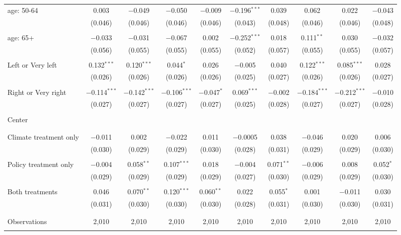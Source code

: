 \begin{tabular}{@{\extracolsep{5pt}}lccccccccc}
 age: 50-64 & 0.003 & $-$0.049 & $-$0.050 & $-$0.009 & $-$0.196$^{***}$ & 0.039 & 0.062 & 0.022 & $-$0.043 \\ 
  & (0.046) & (0.046) & (0.046) & (0.046) & (0.043) & (0.048) & (0.046) & (0.046) & (0.048) \\ 
  & & & & & & & & & \\ 
 age: 65+ & $-$0.033 & $-$0.031 & $-$0.067 & 0.002 & $-$0.252$^{***}$ & 0.018 & 0.111$^{**}$ & 0.030 & $-$0.032 \\ 
  & (0.056) & (0.055) & (0.055) & (0.055) & (0.052) & (0.057) & (0.055) & (0.055) & (0.057) \\ 
  & & & & & & & & & \\ 
 Left or Very left & 0.132$^{***}$ & 0.120$^{***}$ & 0.044$^{*}$ & 0.026 & $-$0.005 & 0.040 & 0.122$^{***}$ & 0.085$^{***}$ & 0.028 \\ 
  & (0.026) & (0.026) & (0.026) & (0.026) & (0.025) & (0.027) & (0.026) & (0.026) & (0.027) \\ 
  & & & & & & & & & \\ 
 Right or Very right & $-$0.114$^{***}$ & $-$0.142$^{***}$ & $-$0.106$^{***}$ & $-$0.047$^{*}$ & 0.069$^{***}$ & $-$0.002 & $-$0.184$^{***}$ & $-$0.212$^{***}$ & $-$0.010 \\ 
  & (0.027) & (0.027) & (0.027) & (0.027) & (0.025) & (0.028) & (0.027) & (0.027) & (0.028) \\ 
  & & & & & & & & & \\ 
 Center &  &  &  &  &  &  &  &  &  \\ 
  &  &  &  &  &  &  &  &  &  \\ 
  & & & & & & & & & \\ 
 Climate treatment only & $-$0.011 & 0.002 & $-$0.022 & 0.011 & $-$0.0005 & 0.038 & $-$0.046 & 0.020 & 0.006 \\ 
  & (0.030) & (0.029) & (0.029) & (0.030) & (0.028) & (0.031) & (0.029) & (0.029) & (0.030) \\ 
  & & & & & & & & & \\ 
 Policy treatment only & $-$0.004 & 0.058$^{**}$ & 0.107$^{***}$ & 0.018 & $-$0.004 & 0.071$^{**}$ & $-$0.006 & 0.008 & 0.052$^{*}$ \\ 
  & (0.029) & (0.029) & (0.029) & (0.029) & (0.027) & (0.030) & (0.029) & (0.029) & (0.030) \\ 
  & & & & & & & & & \\ 
 Both treatments & 0.046 & 0.070$^{**}$ & 0.120$^{***}$ & 0.060$^{**}$ & 0.022 & 0.055$^{*}$ & 0.001 & $-$0.011 & 0.030 \\ 
  & (0.031) & (0.030) & (0.030) & (0.030) & (0.028) & (0.031) & (0.030) & (0.030) & (0.031) \\ 
  & & & & & & & & & \\ 
\hline \\[-1.8ex] 

Observations & 2,010 & 2,010 & 2,010 & 2,010 & 2,010 & 2,010 & 2,010 & 2,010 & 2,010 \\ 
\hline 
\hline \\[-1.8ex] 
\end{tabular} 